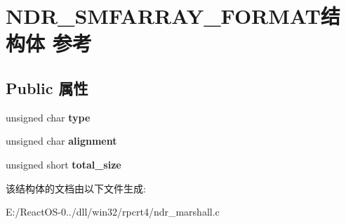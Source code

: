 \hypertarget{struct_n_d_r___s_m_f_a_r_r_a_y___f_o_r_m_a_t}{}\section{N\+D\+R\+\_\+\+S\+M\+F\+A\+R\+R\+A\+Y\+\_\+\+F\+O\+R\+M\+A\+T结构体 参考}
\label{struct_n_d_r___s_m_f_a_r_r_a_y___f_o_r_m_a_t}
\subsection*{Public 属性}
\begin{DoxyCompactItemize}
\item 
\mbox{\label{struct_n_d_r___s_m_f_a_r_r_a_y___f_o_r_m_a_t_aa6499c751011b664f3482de873e5f3a2}} 
unsigned char {\bfseries type}
\item 
\mbox{\label{struct_n_d_r___s_m_f_a_r_r_a_y___f_o_r_m_a_t_aa2e192d1cfbd772b3a88c1706f66e33f}} 
unsigned char {\bfseries alignment}
\item 
\mbox{\label{struct_n_d_r___s_m_f_a_r_r_a_y___f_o_r_m_a_t_ac140f07afad7d931bb2c962c63ff2432}} 
unsigned short {\bfseries total\+\_\+size}
\end{DoxyCompactItemize}


该结构体的文档由以下文件生成\+:\begin{DoxyCompactItemize}
\item 
E\+:/\+React\+O\+S-\/0../dll/win32/rpcrt4/ndr\+\_\+marshall.\+c\end{DoxyCompactItemize}
